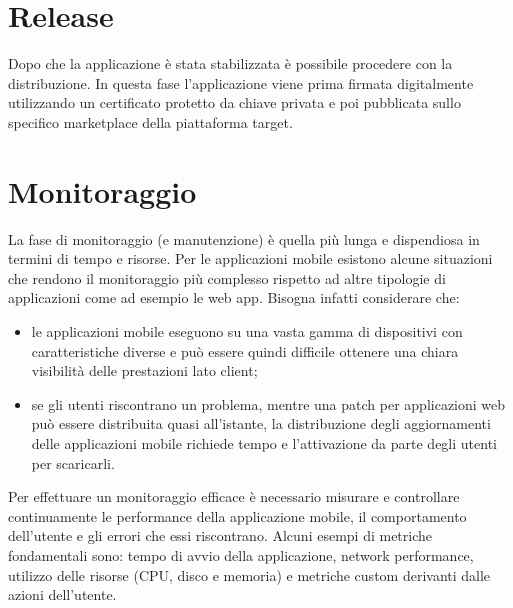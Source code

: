 \section{Release}
Dopo che la applicazione è stata stabilizzata è possibile procedere con la distribuzione. In questa fase l'applicazione viene prima firmata digitalmente utilizzando un certificato protetto da chiave privata e poi pubblicata sullo specifico marketplace della piattaforma target.


\section{Monitoraggio}
La fase di monitoraggio (e manutenzione) è quella più lunga e dispendiosa in termini di tempo e risorse. Per le applicazioni mobile esistono alcune situazioni che rendono il monitoraggio più complesso rispetto ad altre tipologie di applicazioni come ad esempio le web app. Bisogna infatti considerare che\cite{mamonitoring}:
\begin{itemize}
    \item le applicazioni mobile eseguono su una vasta gamma di dispositivi con caratteristiche diverse e può essere quindi difficile ottenere una chiara visibilità delle prestazioni lato client;
    \item se gli utenti riscontrano un problema, mentre una patch per applicazioni web può essere distribuita quasi all'istante, la distribuzione degli aggiornamenti delle applicazioni mobile richiede tempo e l'attivazione da parte degli utenti per scaricarli.
\end{itemize}
Per effettuare un monitoraggio efficace è necessario misurare e controllare continuamente le performance della applicazione mobile, il comportamento dell'utente e gli errori che essi riscontrano. Alcuni esempi di metriche fondamentali sono: tempo di avvio della applicazione, network performance, utilizzo delle risorse (CPU, disco e memoria) e metriche custom derivanti dalle azioni dell'utente.